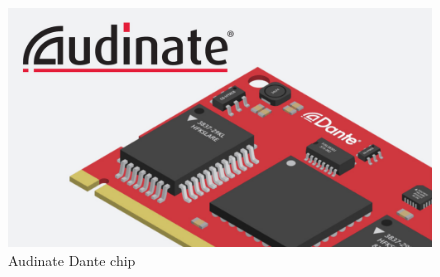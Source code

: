 \begin{figure}[H]
	\centering
	\includegraphics[width=\linewidth, keepaspectratio]{figures/dante_chip.jpg}
	\caption{Audinate Dante chip}
	\label {fig:dante_chip}
\end{figure}


